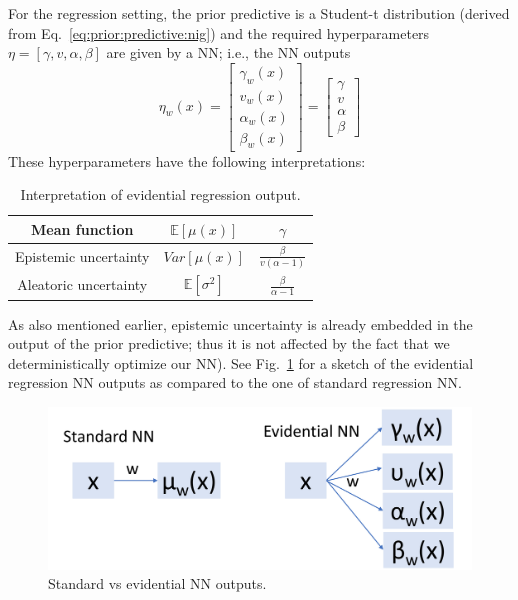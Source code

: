 For the regression setting, the prior predictive is a Student-t distribution (derived from Eq.~\eqref{eq:prior:predictive:nig}) and the required hyperparameters $\eta = [\gamma, v, \alpha, \beta]$ are given by a NN; i.e., the NN outputs 
\begin{equation}
	\eta_w(x) = \begin{bmatrix}
		\gamma_w(x) \\ v_w(x) \\ \alpha_w(x) \\ \beta_w(x)
	\end{bmatrix}
	= \begin{bmatrix}
		\gamma \\ v \\ \alpha \\ \beta
	\end{bmatrix}
\end{equation}
These hyperparameters have the following interpretations:
\begin{table}[H]
	\centering
	\begin{tabular}{ | c | c | c  |} 
		\hline
		Mean function & $\mathbb{E}[\mu(x)]$ & $\gamma$ \\
		\hline
		Epistemic uncertainty & $Var[\mu(x)]$ & $\frac{\beta}{v(\alpha - 1)}$\\
		\hline
		Aleatoric uncertainty & $\mathbb{E}[\sigma^2]$ & $\frac{\beta}{\alpha - 1}$\\
		\hline
	\end{tabular}
	\caption{Interpretation of evidential regression output.}
	\label{tab:evidential:regression}
	\end{table}
As also mentioned earlier, epistemic uncertainty is already embedded in the output of the prior predictive; thus it is not affected by the fact that we deterministically optimize our NN).
See Fig.~\ref{fig:standard:vs:evidential} for a sketch of the evidential regression NN outputs as compared to the one of standard regression NN.
\begin{figure}[H]
	\centering
	\includegraphics[width=.85\linewidth]{./figs/standard_vs_evidential.jpg}
	\caption{Standard vs evidential NN outputs.}
	\label{fig:standard:vs:evidential}
\end{figure}

